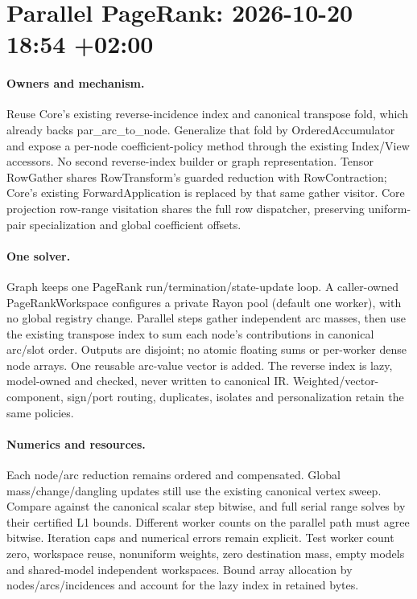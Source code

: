 \documentclass[11pt,a4paper]{article}
\begin{document}
\clearpage\section*{Parallel PageRank: 2026-10-20 18:54 +02:00}
\paragraph{Owners and mechanism.} Reuse Core's existing reverse-incidence index and
canonical transpose fold, which already backs par\_arc\_to\_node. Generalize that fold
by OrderedAccumulator and expose a per-node coefficient-policy method through the
existing Index/View accessors. No second reverse-index builder or graph representation.
Tensor RowGather shares RowTransform's guarded reduction with RowContraction;
Core's existing ForwardApplication is replaced by that same gather visitor.
Core projection row-range visitation shares the full row dispatcher, preserving
uniform-pair specialization and global coefficient offsets.
\paragraph{One solver.} Graph keeps one PageRank run/termination/state-update loop.
A caller-owned PageRankWorkspace configures a private Rayon pool (default one worker),
with no global registry change. Parallel steps gather independent arc masses, then
use the existing transpose index to sum each node's contributions in canonical
arc/slot order. Outputs are disjoint; no atomic floating sums or per-worker dense
node arrays. One reusable arc-value vector is added. The reverse index is lazy,
model-owned and checked, never written to canonical IR. Weighted/vector-component,
sign/port routing, duplicates, isolates and personalization retain the same policies.
\paragraph{Numerics and resources.} Each node/arc reduction remains ordered and
compensated. Global mass/change/dangling updates still use the existing canonical
vertex sweep. Compare against the canonical scalar step bitwise, and full serial
range solves by their certified L1 bounds. Different worker counts on the parallel
path must agree bitwise. Iteration caps and numerical errors remain explicit.
Test worker count zero, workspace reuse, nonuniform weights, zero destination mass,
empty models and shared-model independent workspaces. Bound array allocation by
nodes/arcs/incidences and account for the lazy index in retained bytes.
\end{document}
